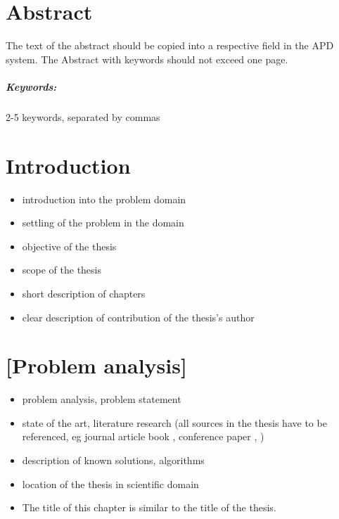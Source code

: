 \documentclass[a4paper,twoside,12pt]{book}
\newcounter{PagesWithoutNumbers}
\begin{document}
\pagestyle{onlyPageNumbers}
\tableofcontents

\setcounter{PagesWithoutNumbers}{\value{page}}
\mainmatter

\pagestyle{empty}

\chapter*{Abstract}

The text of the abstract should be copied into a respective field in the APD system. The Abstract with keywords should not exceed one page.

\paragraph{Keywords:} 2-5 keywords, separated by commas


\cleardoublepage



\pagestyle{PageNumbersChapterTitles}


\chapter{Introduction}

\begin{itemize}
\item introduction into the problem domain
\item settling of the problem in the domain
\item objective of the thesis 
\item scope of the thesis
\item short description of chapters
\item clear description of contribution of the thesis's author
\end{itemize}


\chapter{[Problem analysis]}

\begin{itemize}
\item problem analysis, problem statement
\item state of the art, literature research (all sources in the thesis have to be referenced, eg journal article \cite{bib:article} book \cite{bib:book}, conference paper \cite{bib:conference},  \cite{bib:url})
\item description of known solutions, algorithms
\item location of the thesis in scientific domain
\item The title of this chapter is similar to the title of the thesis.
\end{itemize}
\end{document}
